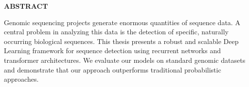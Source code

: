 \begin{center}
    \vspace*{1.0cm}
    {\large \bfseries ABSTRACT}\\[1.5cm]
\end{center}

\noindent Genomic sequencing projects generate enormous quantities of sequence data. A central problem in analyzing this data is the detection of specific, naturally occurring biological sequences. This thesis presents a robust and scalable Deep Learning framework for sequence detection using recurrent networks and transformer architectures. We evaluate our models on standard genomic datasets and demonstrate that our approach outperforms traditional probabilistic approaches.
